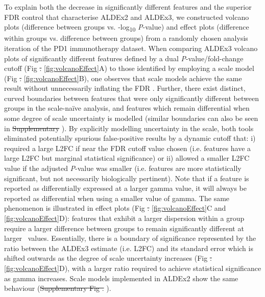 \documentclass[10pt,letterpaper]{article}
\providecommand{\DIFaddtex}[1]{{\protect\color{blue}\uwave{#1}}} %
\providecommand{\DIFdeltex}[1]{{\protect\color{red}\sout{#1}}}                      %
\providecommand{\DIFaddbegin}{} %
\providecommand{\DIFaddend}{} %
\providecommand{\DIFdelbegin}{} %
\providecommand{\DIFdelend}{} %
\providecommand{\DIFadd}[1]{\texorpdfstring{\DIFaddtex{#1}}{#1}} %
\providecommand{\DIFdel}[1]{\texorpdfstring{\DIFdeltex{#1}}{}} %
\newcommand{\DIFscaledelfig}{0.5}
\newlength{\DIFdelgraphicswidth} %
\newlength{\DIFdelgraphicsheight} %
\newcommand{\DIFaddincludegraphics}[2][]{{\color{blue}\fbox{\DIFOincludegraphics[#1]{#2}}}} %
\newcommand{\DIFdelincludegraphics}[2][]{%
\sbox{\DIFdelgraphicsbox}{\DIFOincludegraphics[#1]{#2}}%
\settoboxwidth{\DIFdelgraphicswidth}{\DIFdelgraphicsbox} %
\settoboxtotalheight{\DIFdelgraphicsheight}{\DIFdelgraphicsbox} %
\scalebox{\DIFscaledelfig}{%
\parbox[b]{\DIFdelgraphicswidth}{\usebox{\DIFdelgraphicsbox}\\[-\baselineskip] \rule{\DIFdelgraphicswidth}{0em}}\llap{\resizebox{\DIFdelgraphicswidth}{\DIFdelgraphicsheight}{%
\setlength{\unitlength}{\DIFdelgraphicswidth}%
\begin{picture}(1,1)%
\thicklines\linethickness{2pt} %
{\color[rgb]{1,0,0}\put(0,0){\framebox(1,1){}}}%
{\color[rgb]{1,0,0}\put(0,0){\line( 1,1){1}}}%
{\color[rgb]{1,0,0}\put(0,1){\line(1,-1){1}}}%
\end{picture}%
}\hspace*{3pt}}} %
} %
\DeclareRobustCommand{\DIFaddbegin}{\DIFOaddbegin \let\includegraphics\DIFaddincludegraphics} %
\DeclareRobustCommand{\DIFaddend}{\DIFOaddend \let\includegraphics\DIFOincludegraphics} %
\DeclareRobustCommand{\DIFdelbegin}{\DIFOdelbegin \let\includegraphics\DIFdelincludegraphics} %
\DeclareRobustCommand{\DIFdelend}{\DIFOaddend \let\includegraphics\DIFOincludegraphics} %
\begin{document}
To explain both the decrease in significantly different features and the superior FDR control that characterise ALDEx2 and ALDEx3, we constructed volcano plots \cite{Cui:2003aa} (difference between groups vs. -log\textsubscript{10} \textit{P}-value) and effect plots \cite{gloor:effect} (difference within groups vs. difference between groups) from a randomly chosen analysis iteration of the PD1 immunotherapy dataset. When comparing ALDEx3 volcano plots of significantly different features defined by a dual \textit{P}-value/fold-change cutoff (Fig \DIFdelbegin \DIFdel{. }\DIFdelend \ref{fig:volcanoEffect}A) to those identified by employing a scale model (Fig \DIFdelbegin \DIFdel{. }\DIFdelend \ref{fig:volcanoEffect}B), one observes that scale models achieve the same result without unnecessarily inflating the FDR \cite{ebrahimpoor_inflated_2021}. Further, there exist distinct, curved boundaries between features that were only significantly different between groups in the scale-na\"ive analysis, and features which remain differential when some degree of scale uncertainty is modelled (similar boundaries can also be seen in  \DIFdelbegin \DIFdel{Supplementary }\DIFdelend {}). By explicitly modelling uncertainty in the scale, both tools eliminated potentially spurious false-positive results by a dynamic cutoff that: i) required a large L2FC if near the FDR cutoff value chosen (i.e. features have a large L2FC but marginal statistical significance) or ii) allowed a smaller L2FC value if the adjusted \textit{P}-value was smaller (i.e. features are more statistically significant, but not necessarily biologically pertinent). Note that if a feature is reported as differentially expressed at a larger gamma value, it will always be reported as differential when using a smaller value of gamma. The same phenomenon is illustrated in effect plots (Fig \DIFdelbegin \DIFdel{. }\DIFdelend \ref{fig:volcanoEffect}C and \ref{fig:volcanoEffect}D): features that exhibit a larger dispersion within a group require a larger difference between groups to remain significantly different at larger \textgamma~values. Essentially, there is a boundary of significance represented by the ratio between the ALDEx3 estimate (i.e. L2FC) and its standard error which is shifted outwards as the degree of scale uncertainty increases (Fig \DIFdelbegin \DIFdel{. }\DIFdelend \ref{fig:volcanoEffect}D), with a larger ratio required to achieve statistical significance as gamma increases. Scale models implemented in ALDEx2 show the same behaviour (\DIFdelbegin \DIFdel{Supplementary Fig . }\DIFdelend \DIFaddbegin \DIFadd{Fig }\DIFaddend {}).
\end{document}
